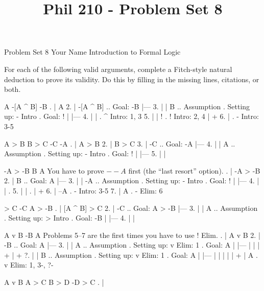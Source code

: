 
\title{Phil 210 - Problem Set 8}

\heading
Problem Set 8
Your Name
Introduction to Formal Logic
\endheading

For each of the following valid arguments, complete a Fitch-style natural deduction to prove its validity. Do this by filling in the missing lines, citations, or both.

\problems
{}
\argument
 A
 -[A ^ B]
\argumentline
 -B
\endargument
	\answer
	. | A
	 2. | -[A ^ B]   ..  Goal: -B
	    |---
	 3. |   | B      ..  Assumption  .  Setting up: - Intro  .  Goal: !
	    |   |---
	 4. |   |        .  ^ Intro: 1, 3
	 5. |   | !      .  ! Intro: 2, 4
	    |   +
	 6. |            .  - Intro: 3-5
	\endfitchproof
	\endanswer

\argument
 A > B
 B > C
 -C
\argumentline
 -A
\endargument
	\answer
	. | A > B
	 2. | B > C
	 3. | -C      ..  Goal: -A
	    |---
	 4. |   | A   ..  Assumption  .  Setting up: - Intro  .  Goal: !
	    |   |---
	 5. |   | 
	\endfitchproof
	\endanswer

\argument
 -A > -B
 B
\argumentline
 A
\endargument
\Hint You have to prove $--A$ first (the ``last resort'' option).
	\answer
	. | -A > -B
	 2. | B        ..  Goal: A
	    |---
	 3. |   | -A   ..  Assumption  .  Setting up: - Intro  .  Goal: !
	    |   |---
	 4. |   |      .  
	 5. |   |      .  
	    |   +
	 6. | --A      .  - Intro: 3-5
	 7. | A        .  - Elim: 6
	\endfitchproof
	\endanswer

\argument
 [A ^ B] > C
 -C
\argumentline
 A > -B
\endargument
	\answer
	. | [A ^ B] > C
	 2. | -C            .. Goal: A > -B
	    |---
	 3. |   | A         ..  Assumption  .  Setting up: > Intro  .  Goal: -B
	    |   |---
	 4. |   | 
	\endfitchproof
	\endanswer

\widerfitchsetup
{}
\argument
 A v B
 -B
\argumentline
 A
\endargument
\Hint Problems 5--7 are the first times you have to use $!$ Elim.
	\answer
	. | A v B
	 2. | -B      ..  Goal: A
	    |---
	 3. |   | A   ..  Assumption  .  Setting up: v Elim: 1  .  Goal: A
	    |   |---
	    |   | 
	    |   +
	    |   +
	 ?. |   | B   ..  Assumption  .  Setting up: v Elim: 1  .  Goal: A
	    |   |---
	    |   | 
	    |   | 
	    |   +
	    | A       .  v Elim: 1, 3-, ?-
	\endfitchproof
	\endanswer

\argument
 A v B
 A > C
 B > D
\argumentline
 -D > C
\endargument
	\answer
	. | 
	\endfitchproof
	\endanswer

